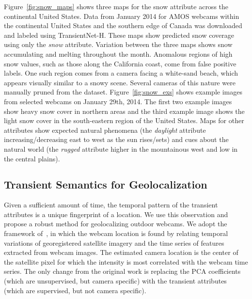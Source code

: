 \documentclass[10pt,twocolumn,letterpaper]{article}
\newcommand{\figref}[1]{Figure~\ref{fig:#1}}
\begin{document}
\figref{snow_maps} shows
three maps for the snow attribute across the continental United States.  Data
from January 2014 for AMOS webcams within the continental United States and the
southern edge of Canada was downloaded and labeled using TransientNet-H. These
maps show predicted snow coverage using only the \emph{snow} attribute.
Variation between the three maps shows snow accumulating and melting throughout
the month.  Anomalous regions of high snow values, such as those along the
California coast, come from false positive labels.  One such region comes from
a camera facing a white-sand beach, which appears visually similar to a snowy
scene.  Several cameras of this nature were manually pruned from the dataset.
\figref{snow_exs} shows example images from selected webcams on January 29th,
2014. The first two example images show heavy snow cover in northern areas and
the third example image shows the light snow cover in the south-eastern region
of the United States.  Maps for other attributes show expected natural
phenomena (the \textit{daylight} attribute increasing/decreasing east to west
as the sun rises/sets) and cues about the natural world (the \textit{rugged}
attribute higher in the mountainous west and low in the central plains).  

\subsection{Transient Semantics for Geolocalization}

Given a sufficient amount of time, the temporal pattern of the
transient attributes is a unique fingerprint of a location. We use
this observation and propose a robust method for geolocalizing outdoor
webcams. We adopt the framework of~\cite{jacobs07geolocate}, in which
the webcam location is found by relating temporal variations of
georegistered satellite imagery and the time series of features
extracted from webcam images. The estimated camera location is the
center of the satellite pixel for which the intensity is most
correlated with the webcam time series. The only change from the
original work is replacing the PCA coefficients (which are
unsupervised, but camera specific) with the transient attributes
(which are supervised, but not camera specific).
\end{document}

